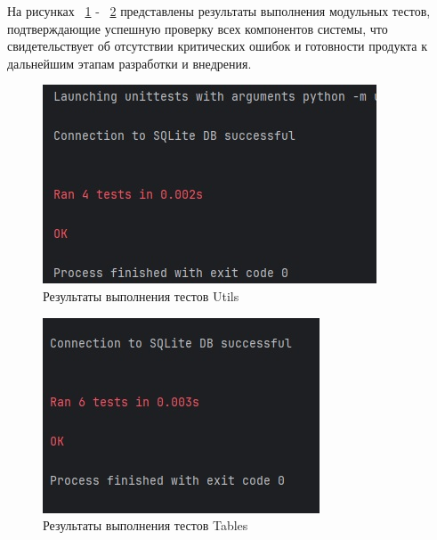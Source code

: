 На рисунках ~\ref{fig:test2} - ~\ref{fig:test3} представлены результаты выполнения модульных тестов, подтверждающие успешную проверку всех компонентов системы, что свидетельствует об отсутствии критических ошибок и готовности продукта к дальнейшим этапам разработки и внедрения.
\begin{figure}[H]
	\centering
	\includegraphics[width=0.85\linewidth]{images/test2}
	\caption{Результаты выполнения тестов Utils}
	\label{fig:test2}
\end{figure}

\begin{figure}[H]
	\centering
	\includegraphics[width=0.85\linewidth]{images/test3}
	\caption{Результаты выполнения тестов Tables}
	\label{fig:test3}
\end{figure}


